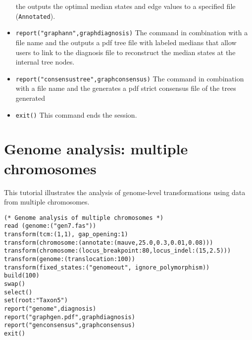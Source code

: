 \begin{itemize}
the  outputs the optimal median states and edge values to a specified file 
(\texttt{Annotated}). 
\item \texttt{report("graphann",graphdiagnosis)}  The  command in combination with a file name and the
  outputs a pdf tree file with labeled medians that allow users to link to the diagnosis file to reconstruct
 the median states at the internal tree nodes.
 \item \texttt{report("consensustree",graphconsensus)}  The  command in combination with a file 
name and the  generates a pdf strict consensus file of the trees generated 
\item \texttt{exit()} This command ends the \poy session.
\end{itemize}


\section{Genome analysis: multiple chromosomes}{\label{tutorial10}}

This tutorial illustrates the analysis of genome-level transformations using data from multiple chromosomes. 

\begin{verbatim}
(* Genome analysis of multiple chromosomes *)
read (genome:("gen7.fas"))
transform(tcm:(1,1), gap_opening:1)
transform(chromosome:(annotate:(mauve,25.0,0.3,0.01,0.08)))
transform(chromosome:(locus_breakpoint:80,locus_indel:(15,2.5)))
transform(genome:(translocation:100))
transform(fixed_states:("genomeout", ignore_polymorphism))
build(100)
swap()
select()
set(root:"Taxon5")
report("genome",diagnosis)
report("graphgen.pdf",graphdiagnosis)
report("genconsensus",graphconsensus)
exit()
\end{verbatim}

